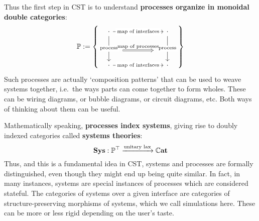 Thus the first step in CST is to understand \textbf{processes organize in monoidal double categories}:
\begin{equation}
	\Processes := \left\{
		{\scriptstyle
		\begin{tikzcd}[ampersand replacement=\&, column sep=normal]
			\cdot \&\&\& \cdot \\
			\\
			\cdot \&\&\& \cdot
			\arrow[""{name=0, anchor=center, inner sep=0}, "{\text{process}}"{description}, from=1-1, to=3-1]
			\arrow[""{name=1, anchor=center, inner sep=0}, "{\text{process}}"{description}, from=1-4, to=3-4]
			\arrow["{\text{map of interfaces}}"{description}, from=1-1, to=1-4]
			\arrow["{\text{map of interfaces}}"{description}, from=3-1, to=3-4]
			\arrow["{\text{map of processes}}", shift right=1, shorten <=19pt, shorten >=19pt, Rightarrow, from=0, to=1]
		\end{tikzcd}}
	\right\}
\end{equation}
Such processes are actually `composition patterns' that can be used to weave systems together, i.e.~the ways parts can come together to form wholes. These can be wiring diagrams, or bubble diagrams, or circuit diagrams, etc. Both ways of thinking about them can be useful.

Mathematically speaking, \textbf{processes index systems}, giving rise to doubly indexed categories called \textbf{systems theories}:
\begin{equation}
	\Sys : \Processes^\top \unilaxto \dblCat
\end{equation}
Thus, and this is a fundamental idea in CST, systems and processes are formally distinguished, even though they might end up being quite similar. In fact, in many instances, systems are special instances of processes which are considered stateful.
The categories of systems over a given interface are categories of structure-preserving morphisms of systems, which we call simulations here. These can be more or less rigid depending on the user's taste.


